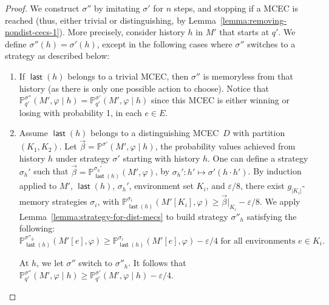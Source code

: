\documentclass[a4paper,USenglish,cleveref, autoref, thm-restate]{lipics-v2021}
\let\epsilon\varepsilon
\def\abs#1{\ensuremath{\lvert #1 \rvert}}
\newcommand*{\pr}{\mathbb{P}}
\newcommand{\last}{\operatorname{\mathsf{last}}}
\begin{document}
\begin{proof}
  We construct $\sigma''$ by imitating $\sigma'$ for $n$ steps, and stopping if a MCEC is reached (thus, either trivial or distinguishing, by Lemma~\ref{lemma:removing-nondist-cecs-1}).
  More precisely, consider history $h$ in $M'$ that starts at $q'$. We define $\sigma''(h) = \sigma'(h)$, except in the following cases
  where $\sigma''$ switches to a strategy as described below:
  \begin{enumerate}
    \item If $\last(h)$ belongs to a trivial MCEC, then $\sigma''$ is memoryless from that history (as there is only one possible action to choose).
    Notice that $\pr_{q'}^{\sigma''}(M',\varphi \mid h ) = \pr_{q'}^{\sigma'}(M',\varphi\mid h)$ since this MCEC is either winning or losing with probability 1,
    in each $e\in E$.
    
    \item Assume $\last(h)$ belongs to a distinguishing MCEC~$D$ with partition $(K_1,K_2)$. 
    Let $\vec{\beta} = \pr^{\sigma'}(M',\varphi \mid h)$, the probability values achieved from history $h$ under strategy $\sigma'$ starting with history $h$.
    One can define a strategy $\sigma_h'$ such that 
    $\vec{\beta} = \pr_{\last(h)}^{\sigma_h'}(M',\varphi)$, by $\sigma_h' : h' \mapsto \sigma'(h \cdot h')$.
    By induction applied to $M'$, $\last(h)$, $\sigma_h'$, environment set $K_i$, 
    and $\epsilon/8$,
    there exist $g_{\abs{K_i}}$-memory strategies $\sigma_i$, 
    with $\pr_{\last(h)}^{\sigma_i}(M'[K_i],\varphi)\geq \vec{\beta}{\vert}_{K_i} - \epsilon/8$.
    We apply Lemma~\ref{lemma:strategy-for-dist-mecs} to build strategy $\sigma''_h$ satisfying the following:
    \begin{equation}
      \label{eqn:quant-switch-dist-cec}
      \pr_{\last(h)}^{\sigma''_h}(M'[e], \varphi) \geq \pr_{\last(h)}^{\sigma_i}(M'[e],\varphi) - \epsilon/4 \text{ for all environments } e \in K_i.
    \end{equation}
    
    At $h$, we let $\sigma''$ switch to $\sigma''_h$.
    It follows that $\pr_{q'}^{\sigma''}(M',\varphi \mid h ) \geq \pr_{q'}^{\sigma'}(M',\varphi \mid h) - \epsilon/4$.




\end{enumerate}
\end{proof}
\end{document}
